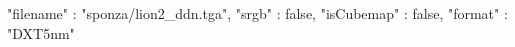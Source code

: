 { 
	"filename" : "sponza/lion2_ddn.tga", 
	"srgb" : false,
	"isCubemap" : false,
	"format" : "DXT5nm"
}